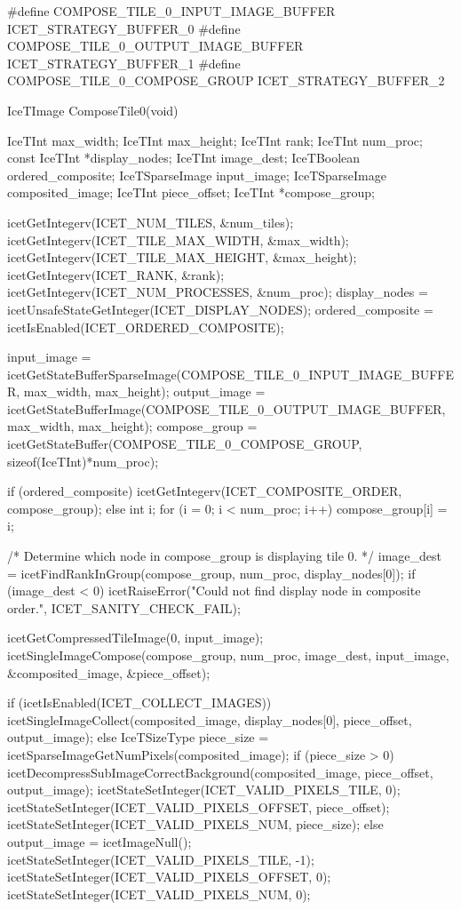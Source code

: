 \begin{code}
#define COMPOSE_TILE_0_INPUT_IMAGE_BUFFER       ICET_STRATEGY_BUFFER_0
#define COMPOSE_TILE_0_OUTPUT_IMAGE_BUFFER      ICET_STRATEGY_BUFFER_1
#define COMPOSE_TILE_0_COMPOSE_GROUP            ICET_STRATEGY_BUFFER_2

IceTImage ComposeTile0(void)
{
  IceTInt max_width;
  IceTInt max_height;
  IceTInt rank;
  IceTInt num_proc;
  const IceTInt *display_nodes;
  IceTInt image_dest;
  IceTBoolean ordered_composite;
  IceTSparseImage input_image;
  IceTSparseImage composited_image;
  IceTInt piece_offset;
  IceTInt *compose_group;

  icetGetIntegerv(ICET_NUM_TILES, &num_tiles);
  icetGetIntegerv(ICET_TILE_MAX_WIDTH, &max_width);
  icetGetIntegerv(ICET_TILE_MAX_HEIGHT, &max_height);
  icetGetIntegerv(ICET_RANK, &rank);
  icetGetIntegerv(ICET_NUM_PROCESSES, &num_proc);
  display_nodes = icetUnsafeStateGetInteger(ICET_DISPLAY_NODES);
  ordered_composite = icetIsEnabled(ICET_ORDERED_COMPOSITE);

  input_image = icetGetStateBufferSparseImage(COMPOSE_TILE_0_INPUT_IMAGE_BUFFER,
                                              max_width, max_height);
  output_image = icetGetStateBufferImage(COMPOSE_TILE_0_OUTPUT_IMAGE_BUFFER,
                                         max_width, max_height);
  compose_group = icetGetStateBuffer(COMPOSE_TILE_0_COMPOSE_GROUP,
                                     sizeof(IceTInt)*num_proc);

  if (ordered_composite) {
    icetGetIntegerv(ICET_COMPOSITE_ORDER, compose_group);
  } else {
    int i;
    for (i = 0; i < num_proc; i++) {
      compose_group[i] = i;
    }
  }

  /* Determine which node in compose_group is displaying tile 0. */
  image_dest = icetFindRankInGroup(compose_group, num_proc, display_nodes[0]);
  if (image_dest < 0) {
    icetRaiseError("Could not find display node in composite order.",
                   ICET_SANITY_CHECK_FAIL);
  }

  icetGetCompressedTileImage(0, input_image);
  icetSingleImageCompose(compose_group,
                         num_proc,
                         image_dest,
                         input_image,
                         &composited_image,
                         &piece_offset);

  if (icetIsEnabled(ICET_COLLECT_IMAGES)) {
    icetSingleImageCollect(composited_image,
                           display_nodes[0],
                           piece_offset,
                           output_image);
  } else {
    IceTSizeType piece_size = icetSparseImageGetNumPixels(composited_image);
    if (piece_size > 0) {
      icetDecompressSubImageCorrectBackground(composited_image,
                                              piece_offset,
                                              output_image);
      icetStateSetInteger(ICET_VALID_PIXELS_TILE, 0);
      icetStateSetInteger(ICET_VALID_PIXELS_OFFSET, piece_offset);
      icetStateSetInteger(ICET_VALID_PIXELS_NUM, piece_size);
    } else {
      output_image = icetImageNull();
      icetStateSetInteger(ICET_VALID_PIXELS_TILE, -1);
      icetStateSetInteger(ICET_VALID_PIXELS_OFFSET, 0);
      icetStateSetInteger(ICET_VALID_PIXELS_NUM, 0);
    }
  }

}
\end{code}
